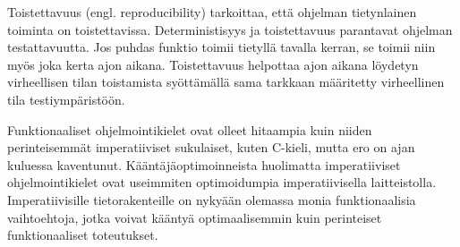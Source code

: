 Toistettavuus (engl. reproducibility) tarkoittaa, että ohjelman tietynlainen toiminta on toistettavissa.
Deterministisyys ja toistettavuus parantavat ohjelman testattavuutta. Jos puhdas funktio toimii tietyllä tavalla kerran,
se toimii niin myös joka kerta ajon aikana. Toistettavuus helpottaa ajon aikana löydetyn virheellisen tilan toistamista
syöttämällä sama tarkkaan määritetty virheellinen tila testiympäristöön. \cite{functionaljava}

Funktionaaliset ohjelmointikielet ovat olleet hitaampia kuin niiden perinteisemmät imperatiiviset sukulaiset, kuten
C-kieli, mutta ero on ajan kuluessa kaventunut. Kääntäjäoptimoinneista huolimatta imperatiiviset ohjelmointikielet
ovat useimmiten optimoidumpia imperatiivisella laitteistolla. Imperatiivisille tietorakenteille on nykyään olemassa
monia funktionaalisia vaihtoehtoja, jotka voivat kääntyä optimaalisemmin kuin perinteiset funktionaaliset toteutukset.
\cite{functionaldatastructures}
